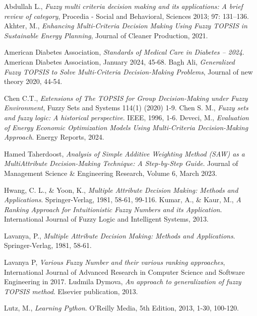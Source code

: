 \documentclass[12pt,a4paper]{article}
\begin{document}
\newpage
{}  %
\begin{thebibliography}{10}
\bibitem{}
Abdullah L.,
\textit{Fuzzy multi criteria decision making and its applications: A brief review of category}, Procedia - Social and Behavioral, Sciences 2013; 97: 131–136.
\bibitem{}
Akhter, M., 
\textit{Enhancing Multi-Criteria Decision Making Using Fuzzy TOPSIS in Sustainable Energy Planning},
Journal of Cleaner Production, 2021.

\bibitem{}
American Diabetes Association,
\textit{Standards of Medical Care in Diabetes – 2024}.
American Diabetes Association, January 2024, 45-68.
\bibitem{}
Bagh Ali,
\textit{Generalized Fuzzy TOPSIS to Solve Multi-Criteria Decision-Making Problems}, Journal of new theory 2020, 44-54.

\bibitem{}
Chen C.T., 
\textit{Extensions of The TOPSIS for Group Decision-Making under Fuzzy Environment}, Fuzzy Sets and Systems 114(1) (2020) 1-9.
\bibitem{}
Chen S. M., 
\textit{Fuzzy sets and fuzzy logic: A historical perspective}.
IEEE, 1996, 1-6.
\bibitem{}
Deveci, M., 
\textit{Evaluation of Energy Economic Optimization Models Using Multi-Criteria Decision-Making Approach}.
Energy Reports, 2024.

\bibitem{}
Hamed Taherdoost, 
\textit{Analysis of Simple Additive Weighting Method (SAW) as a MultiAttribute Decision-Making Technique: A Step-by-Step Guide}.
Journal of Management Science \& Engineering Research, Volume 6, March 2023.

\bibitem{}
Hwang, C. L., \& Yoon, K., 
\textit{Multiple Attribute Decision Making: Methods and Applications}.
Springer-Verlag, 1981, 58-61, 99-116.
\bibitem{}
Kumar, A., \& Kaur, M., 
\textit{A Ranking Approach for Intuitionistic Fuzzy Numbers and its Application}.
International Journal of Fuzzy Logic and Intelligent Systems, 2013.

\bibitem{}
Lavanya, P., 
\textit{Multiple Attribute Decision Making: Methods and Applications}.
Springer-Verlag, 1981, 58-61.

\bibitem{}
Lavanya P,
\textit{Various Fuzzy Number and their various ranking approaches},  International Journal of Advanced Research in Computer Science and Software Engineering in 2017.
\bibitem{}
Ludmila Dymova, 
\textit{An approach to generalization of fuzzy TOPSIS method}.
Elsevier publication, 2013.

\bibitem{}
Lutz, M., 
\textit{Learning Python}.
O'Reilly Media, 5th Edition, 2013, 1-30, 100-120.


\end{thebibliography}
\end{document}
